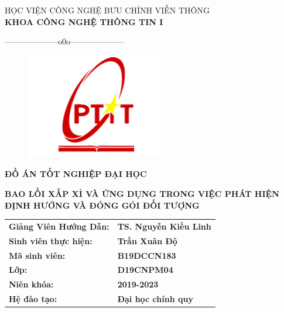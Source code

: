 \documentclass[12pt,a4paper,openany,oneside]{report}
\begin{document}

\setlength{\fboxrule}{1.5pt}
\thisfancypage{\setlength{\fboxsep}{10pt}\setlength{\shadowsize}{0pt}\doublebox}{}

\begin{titlepage}
\fontsize{14pt}{14pt}\selectfont \baselineskip 0.65cm
\thispagestyle{empty}
\begin{center}
{HỌC VIỆN CÔNG NGHỆ BƯU CHÍNH VIỄN THÔNG}\\
\textbf{\MakeUppercase{KHOA CÔNG NGHỆ THÔNG TIN I}}\\
\centerline{--------------------o0o--------------------}  
\end{center}
 

\begin{figure}[H]
	\begin{center}
		\includegraphics[width=6cm]{./logo}
	\end{center}
\end{figure} 
 
 
\vspace{0.5cm}
\begin{center}
\textbf{\MakeUppercase{\Large \bf ĐỒ ÁN TỐT NGHIỆP ĐẠI HỌC}}\\ 
\end{center} 

\vspace{1cm}
\begin{center}
	\textbf{\MakeUppercase{ \bf BAO LỒI XẤP XỈ VÀ ỨNG DỤNG TRONG VIỆC PHÁT HIỆN ĐỊNH HƯỚNG VÀ ĐÓNG GÓI ĐỐI TƯỢNG}}\\ 
\end{center} 
\vspace{2cm}


\begin{tabular}{ll}
	{\textbf{\large{Giảng Viên Hướng Dẫn: }}} & {\textbf{\large{TS. Nguyễn Kiều Linh}}} \\
	{\textbf{\large{Sinh viên thực hiện:}}}  & {\textbf{\large{Trần Xuân Độ}}} \\
	{\textbf{\large{Mã sinh viên: }}}  & {\textbf{\large{B19DCCN183}}} \\
	{\textbf{\large{Lớp:}}}   & {\textbf{\large{D19CNPM04}}}\\
	{\textbf{\large{Niên khóa:}}}   & {\textbf{\large{2019-2023}}}\\
	{\textbf{\large{Hệ đào tạo:}}}   & {\textbf{\large{Đại học chính quy}}}
\end{tabular}






\end{titlepage}
\end{document}
